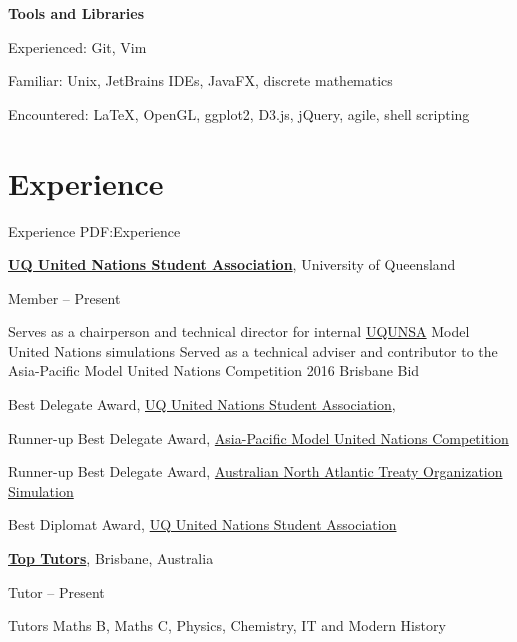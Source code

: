 \documentclass[a4paper,10pt,oneside]{article}
\begin{document}
\begin{body}
\EntryGap

\textbf{Tools and Libraries}
\par Experienced: Git, Vim
\par Familiar: Unix, JetBrains IDEs, JavaFX, discrete mathematics
\par Encountered: \LaTeX, OpenGL, ggplot2, D3.js, jQuery, agile, shell scripting


\section
{Experience}
{Experience}
{PDF:Experience}

\href{http://www.unsauq.org/}
{\textbf{UQ United Nations Student Association}}, University of Queensland

\par Member \hfill {} -- Present

\begin{detail}
\BulletItem Serves as a chairperson and technical director for internal \href{http://www.unsauq.org/}{UQUNSA} Model United Nations simulations 
\BulletItem Served as a technical adviser and contributor to the Asia-Pacific Model United Nations Competition 2016 Brisbane Bid
\end{detail}

\par Best Delegate Award, \href{http://www.unsauq.org/}{UQ United Nations Student Association}, \hfill {}
\par Runner-up Best Delegate Award, \href{http://www.amunc.net/}{Asia-Pacific Model United Nations Competition} \hfill {}
\par Runner-up Best Delegate Award, \href{http://www.ausnatos.org/}{Australian North Atlantic Treaty Organization Simulation} \hfill {}
\par Best Diplomat Award, \href{http://www.unsauq.org/}{UQ United Nations Student Association} \hfill {}

\EntryGap

\href{https://www.toptutors.com.au/}{\textbf{Top Tutors}}, Brisbane, Australia
\par Tutor \hfill {} -- Present
\begin{detail}
Tutors Maths B, Maths C, Physics, Chemistry, IT and Modern History
\end{detail}


\end{body}
\end{document}
